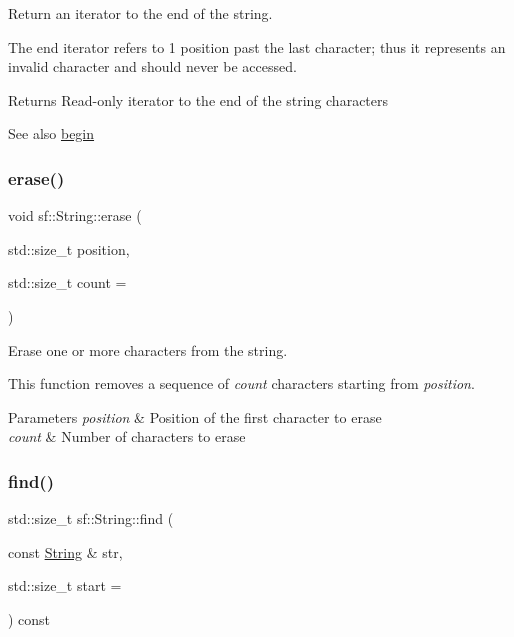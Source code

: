 Return an iterator to the end of the string. 

The end iterator refers to 1 position past the last character; thus it represents an invalid character and should never be accessed.

\begin{DoxyReturn}{Returns}
Read-\/only iterator to the end of the string characters
\end{DoxyReturn}
\begin{DoxySeeAlso}{See also}
\hyperlink{classsf_1_1_string_a8ec30ddc08e3a6bd11c99aed782f6dfe}{begin} 
\end{DoxySeeAlso}
\mbox{\label{classsf_1_1_string_aaa78a0a46b3fbe200a4ccdedc326eb93}} 
\subsubsection{\texorpdfstring{erase()}{erase()}}
{\footnotesize\ttfamily void sf\+::\+String\+::erase (\begin{DoxyParamCaption}\item[{std\+::size\+\_\+t}]{position,  }\item[{std\+::size\+\_\+t}]{count = {} }\end{DoxyParamCaption})}



Erase one or more characters from the string. 

This function removes a sequence of {\itshape count} characters starting from {\itshape position}.


\begin{DoxyParams}{Parameters}
{\em position} & Position of the first character to erase \\
\hline
{\em count} & Number of characters to erase \\
\hline
\end{DoxyParams}
\mbox{\label{classsf_1_1_string_aa189ec8656854106ab8d2e935fd9cbcc}} 
\subsubsection{\texorpdfstring{find()}{find()}}
{\footnotesize\ttfamily std\+::size\+\_\+t sf\+::\+String\+::find (\begin{DoxyParamCaption}\item[{const \hyperlink{classsf_1_1_string}{String} \&}]{str,  }\item[{std\+::size\+\_\+t}]{start = {} }\end{DoxyParamCaption}) const}



